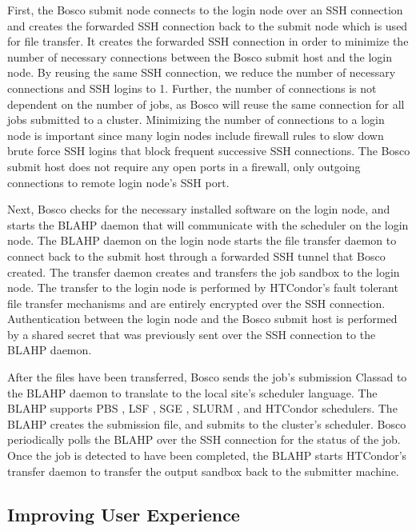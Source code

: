 First, the Bosco submit node connects to the login node over an SSH connection and creates the forwarded SSH connection back to the submit node which is used for file transfer.  It creates the forwarded SSH connection in order to minimize the number of necessary connections between the Bosco submit host and the login node.  By reusing the same SSH connection, we reduce the number of necessary connections and SSH logins to 1.  Further, the number of connections is not dependent on the number of jobs, as Bosco will reuse the same connection for all jobs submitted to a cluster.  Minimizing the number of connections to a login node is important since many login nodes include firewall rules to slow down brute force SSH logins that block frequent successive SSH connections.  The Bosco submit host does not require any open ports in a firewall, only outgoing connections to remote login node's SSH port.

Next, Bosco checks for the necessary installed software on the login node, and starts the BLAHP daemon that will communicate with the scheduler on the login node.  The BLAHP daemon on the login node starts the file transfer daemon to connect back to the submit host through a forwarded SSH tunnel that Bosco created.  The transfer daemon creates and transfers the job sandbox to the login node.  The transfer to the login node is performed by HTCondor's fault tolerant file transfer mechanisms and are entirely encrypted over the SSH connection.  Authentication between the login node and the Bosco submit host is performed by a shared secret that was previously sent over the SSH connection to the BLAHP daemon.

After the files have been transferred, Bosco sends the job's submission Classad \cite{raman1998matchmaking} to the BLAHP daemon to translate to the local site's scheduler language.  The BLAHP supports PBS \cite{computing2013torque}, LSF \cite{computinglsf}, SGE \cite{gentzsch2001sun}, SLURM \cite{yoo2003slurm}, and HTCondor schedulers.  The BLAHP creates the submission file, and submits to the cluster's scheduler.  Bosco periodically polls the BLAHP over the SSH connection for the status of the job.  Once the job is detected to have been completed, the BLAHP starts HTCondor's transfer daemon to transfer the output sandbox back to the submitter machine.

\subsection{Improving User Experience}

